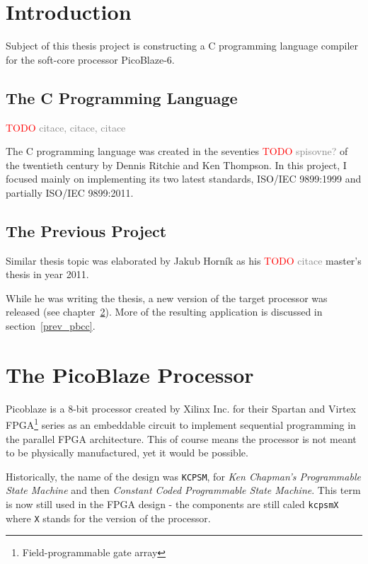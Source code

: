 
\newcommand{\todo}[1]{\textcolor{red}{TODO\:} \textcolor{gray}{#1}}

\chapter{Introduction}\label{introduction}

Subject of this thesis project is constructing a C programming language compiler for the soft-core processor PicoBlaze-6.

    \section{The C Programming Language}

    \todo{citace, citace, citace}

    The C programming language was created in the seventies \todo{spisovne?}
    of the twentieth century by Dennis Ritchie and Ken Thompson. In this project, I focused mainly on implementing its two latest standards, ISO/IEC 9899:1999 and partially ISO/IEC 9899:2011.

    \section{The Previous Project}
    Similar thesis topic was elaborated by Jakub Horník as his \todo{citace}
    master's thesis in year 2011.

    While he was writing the thesis, a new version of the target processor was released (see chapter~\ref{processor}). More of the resulting application is discussed in section~\ref{prev_pbcc}.

\chapter{The PicoBlaze Processor}\label{processor}

Picoblaze is a 8-bit processor created by Xilinx Inc. for their Spartan and Virtex FPGA\footnote{Field-programmable gate array} series as an embeddable circuit to implement sequential programming in the parallel FPGA architecture. This of course means the processor is not meant to be physically manufactured, yet it would be possible.

Historically, the name of the design was \texttt{KCPSM}, for \emph{Ken Chapman's Programmable State Machine} and then \emph{Constant Coded Programmable State Machine}. This term is now still used in the FPGA design - the components are still caled \texttt{kcpsmX} where \texttt{X} stands for the version of the processor.

